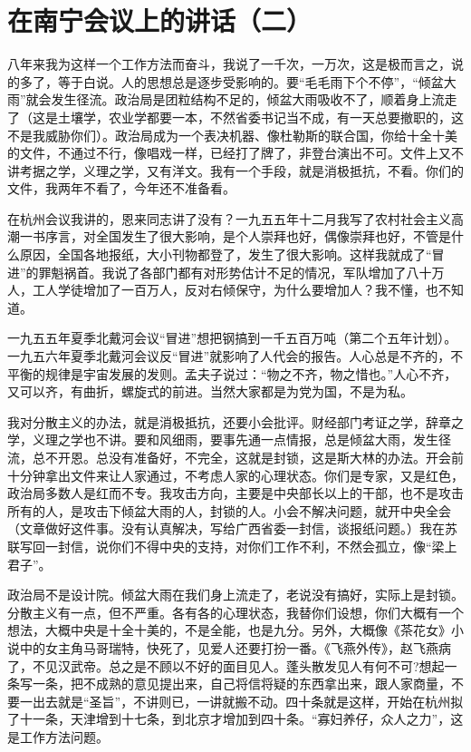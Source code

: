 \section[在南宁会议上的讲话（二）（一九五八年一月十二日）]{在南宁会议上的讲话（二）}


八年来我为这样一个工作方法而奋斗，我说了一千次，一万次，这是极而言之，说的多了，等于白说。人的思想总是逐步受影响的。要“毛毛雨下个不停”，“倾盆大雨”就会发生径流。政治局是团粒结构不足的，倾盆大雨吸收不了，顺着身上流走了（这是土壤学，农业学都要一本，不然省委书记当不成，有一天总要撤职的，这不是我威胁你们）。政治局成为一个表决机器、像杜勒斯的联合国，你给十全十美的文件，不通过不行，像唱戏一样，已经打了牌了，非登台演出不可。文件上又不讲考据之学，义理之学，又有洋文。我有一个手段，就是消极抵抗，不看。你们的文件，我两年不看了，今年还不准备看。

在杭州会议我讲的，恩来同志讲了没有？一九五五年十二月我写了农村社会主义高潮一书序言，对全国发生了很大影响，是个人崇拜也好，偶像崇拜也好，不管是什么原因，全国各地报纸，大小刊物都登了，发生了很大影响。这样我就成了“冒进”的罪魁祸首。我说了各部门都有对形势估计不足的情况，军队增加了八十万人，工人学徒增加了一百万人，反对右倾保守，为什么要增加人？我不懂，也不知道。

一九五五年夏季北戴河会议“冒进”想把钢搞到一千五百万吨（第二个五年计划）。一九五六年夏季北戴河会议反“冒进”就影响了人代会的报告。人心总是不齐的，不平衡的规律是宇宙发展的发则。孟夫子说过：“物之不齐，物之惜也。”人心不齐，又可以齐，有曲折，螺旋式的前进。当然大家都是为党为国，不是为私。

我对分散主义的办法，就是消极抵抗，还要小会批评。财经部门考证之学，辞章之学，义理之学也不讲。要和风细雨，要事先通一点情报，总是倾盆大雨，发生径流，总不开恩。总没有准备好，不完全，这就是封锁，这是斯大林的办法。开会前十分钟拿出文件来让人家通过，不考虑人家的心理状态。你们是专家，又是红色，政治局多数人是红而不专。我攻击方向，主要是中央部长以上的干部，也不是攻击所有的人，是攻击下倾盆大雨的人，封锁的人。小会不解决问题，就开中央全会（文章做好这件事。没有认真解决，写给广西省委一封信，谈报纸问题。）我在苏联写回一封信，说你们不得中央的支持，对你们工作不利，不然会孤立，像“梁上君子”。

政治局不是设计院。倾盆大雨在我们身上流走了，老说没有搞好，实际上是封锁。分散主义有一点，但不严重。各有各的心理状态，我替你们设想，你们大概有一个想法，大概中央是十全十美的，不是全能，也是九分。另外，大概像《茶花女》小说中的女主角马哥瑞特，快死了，见爱人还要打扮一番。《飞燕外传》，赵飞燕病了，不见汉武帝。总之是不顾以不好的面目见人。蓬头散发见人有何不可?想起一条写一条，把不成熟的意见提出来，自己将信将疑的东西拿出来，跟人家商量，不要一出去就是“圣旨”，不讲则已，一讲就搬不动。四十条就是这样，开始在杭州拟了十一条，天津增到十七条，到北京才增加到四十条。“寡妇养仔，众人之力”，这是工作方法问题。

